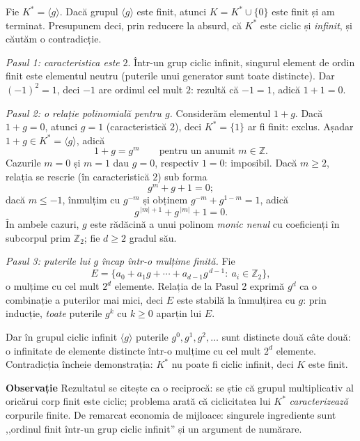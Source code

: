 \begin{solutie}
Fie $K^* = \langle g \rangle$. Dacă grupul $\langle g \rangle$ este finit, atunci $K = K^* \cup \{0\}$ este finit și am terminat. Presupunem deci, prin reducere la absurd, că $K^*$ este ciclic și \emph{infinit}, și căutăm o contradicție.

\emph{Pasul 1: caracteristica este} $2$. Într-un grup ciclic infinit, singurul element de ordin finit este elementul neutru (puterile unui generator sunt toate distincte). Dar $(-1)^2 = 1$, deci $-1$ are ordinul cel mult $2$: rezultă că $-1 = 1$, adică $1 + 1 = 0$.

\emph{Pasul 2: o relație polinomială pentru $g$.} Considerăm elementul $1+g$. Dacă $1+g = 0$, atunci $g = 1$ (caracteristică $2$), deci $K^* = \{1\}$ ar fi finit: exclus. Așadar $1 + g \in K^* = \langle g \rangle$, adică
\[
  1 + g = g^m \qquad \text{pentru un anumit } m \in \mathbb{Z}.
\]
Cazurile $m = 0$ și $m = 1$ dau $g = 0$, respectiv $1 = 0$: imposibil. Dacă $m \geq 2$, relația se rescrie (în caracteristică $2$) sub forma
\[
  g^m + g + 1 = 0;
\]
dacă $m \leq -1$, înmulțim cu $g^{-m}$ și obținem $g^{-m} + g^{1-m} = 1$, adică
\[
  g^{\,|m|+1} + g^{\,|m|} + 1 = 0.
\]
În ambele cazuri, $g$ este rădăcină a unui polinom \emph{monic nenul} cu coeficienți în subcorpul prim $\mathbb{Z}_2$; fie $d \geq 2$ gradul său.

\emph{Pasul 3: puterile lui $g$ încap într-o mulțime finită.} Fie
\[
  E = \bigl\{ a_0 + a_1 g + \cdots + a_{d-1} g^{\,d-1} :\ a_i \in \mathbb{Z}_2 \bigr\},
\]
o mulțime cu cel mult $2^d$ elemente. Relația de la Pasul 2 exprimă $g^d$ ca o combinație a puterilor mai mici, deci $E$ este stabilă la înmulțirea cu $g$: prin inducție, \emph{toate} puterile $g^k$ cu $k \geq 0$ aparțin lui $E$.

Dar în grupul ciclic infinit $\langle g \rangle$ puterile $g^0, g^1, g^2, \ldots$ sunt distincte două câte două: o infinitate de elemente distincte într-o mulțime cu cel mult $2^d$ elemente. Contradicția încheie demonstrația: $K^*$ nu poate fi ciclic infinit, deci $K$ este finit.

\medskip
\noindent\textbf{Observație} Rezultatul se citește ca o reciprocă: se știe că grupul multiplicativ al oricărui corp finit este ciclic; problema arată că ciclicitatea lui $K^*$ \emph{caracterizează} corpurile finite. De remarcat economia de mijloace: singurele ingrediente sunt ,,ordinul finit într-un grup ciclic infinit'' și un argument de numărare.
\end{solutie}

